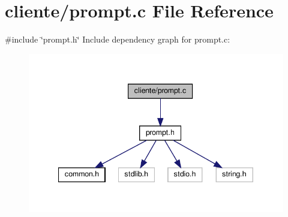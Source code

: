 \section{cliente/prompt.c File Reference}
\label{prompt_8c}
{\ttfamily \#include \char`\"{}prompt.\+h\char`\"{}}\newline
Include dependency graph for prompt.\+c\+:\nopagebreak
\begin{figure}[H]
\begin{center}
\leavevmode
\includegraphics[width=340pt]{prompt_8c__incl}
\end{center}
\end{figure}
